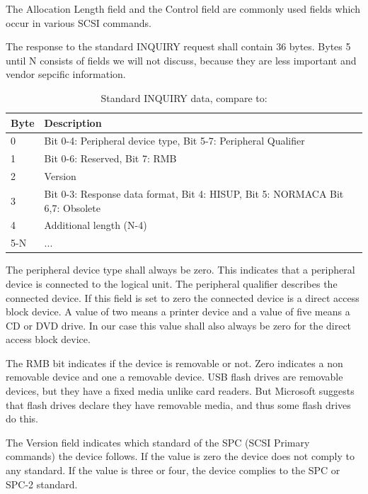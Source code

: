 The Allocation Length field and the Control field are commonly used fields which occur in various SCSI commands\cite{scsi_seagate}.

The response to the standard INQUIRY request shall contain 36 bytes\cite{scsi_seagate}. Bytes 5 until N consists of fields we will not discuss, because they are less important and vendor sepcific information.

\begin{table}[ht]
\caption{Standard INQUIRY data, compare to: \cite{usb_ms_jan, scsi_seagate}}
\centering
\begin{tabular}{|l|l|}
\hline\hline
\textbf{Byte} & \textbf{Description}\\ \hline
0 & Bit 0-4: Peripheral device type, Bit 5-7: Peripheral Qualifier \\ \hline
1 & Bit 0-6: Reserved, Bit 7: RMB \\ \hline
2 & Version \\ \hline
3 & Bit 0-3: Response data format, Bit 4: HISUP, Bit 5: NORMACA Bit 6,7: Obsolete \\ \hline
4 & Additional length (N-4) \\ \hline
5-N & ... \\ \hline
\end{tabular}
\label{table:inquiry_data}
\end{table}

The peripheral device type shall always be zero. This indicates that a peripheral device is connected to the logical unit. The peripheral qualifier describes the connected device. If this field is set to zero the connected device is a direct access block device. A value of two means a printer device and a value of five means a CD or DVD drive\cite{usb_ms_jan, scsi_seagate}. In our case this value shall also always be zero for the direct access block device.

The RMB bit indicates if the device is removable or not. Zero indicates a non removable device and one a removable device. USB flash drives are removable devices, but they have a fixed media unlike card readers. But Microsoft suggests that flash drives declare they have removable media, and thus some flash drives do this\cite{usb_ms_jan}.

The Version field indicates which standard of the SPC (SCSI Primary commands) the device follows. If the value is zero the device does not comply to any standard. If the value is three or four, the device complies to the SPC or SPC-2 standard\cite{usb_ms_jan, scsi_seagate}.

